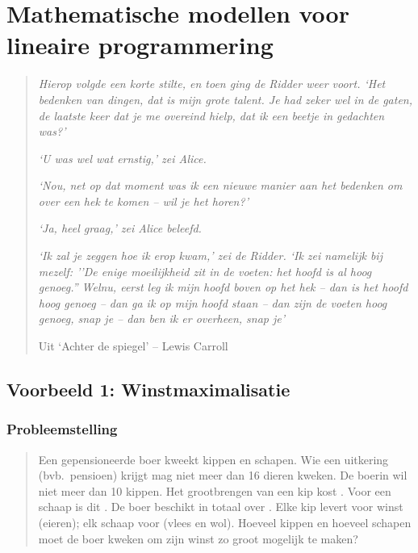 %
%
% 
%
%


%

\chapter{Mathematische modellen voor lineaire programmering}
\begin{quote}
    \textit{{\small Hierop volgde een korte stilte, en toen ging de
    Ridder weer voort. `Het bedenken van dingen, dat is mijn grote
    talent. Je had zeker wel in de gaten, de laatste keer dat je me
    overeind hielp, dat ik een beetje in gedachten was?'}}

    \textit{{\small `U was \emph{wel} wat ernstig,' zei Alice.}}

     \textit{{\small `Nou, net op dat moment was ik een nieuwe manier
     aan het bedenken om over een hek te komen -- wil je het horen?'}}

     \textit{{\small `Ja, heel graag,' zei Alice beleefd.}}

     \textit{{\small `Ik zal je zeggen hoe ik erop kwam,' zei de Ridder. `Ik zei
     namelijk bij mezelf: ''De enige moeilijkheid zit in de voeten:
     het \emph{hoofd} is al hoog genoeg.'' Welnu, eerst leg ik mijn hoofd
     boven op het hek -- dan is het hoofd hoog genoeg -- dan ga ik op
     mijn hoofd staan -- dan zijn de voeten hoog genoeg, snap je --
     dan ben ik er overheen, snap je'}}

          Uit `Achter de spiegel' -- Lewis Carroll
\end{quote}


\newpage
\section{Voorbeeld 1: Winstmaximalisatie}\label{sec.maxprob}
\subsection{Probleemstelling}
\begin{quote}
Een gepensioneerde boer kweekt kippen en schapen. Wie een uitkering
(bvb.\ pensioen) krijgt mag niet meer dan 16 dieren kweken. De
boerin wil niet meer dan 10 kippen. Het grootbrengen van een
kip kost . Voor een schaap is dit . De boer beschikt
in totaal over . Elke kip levert voor  winst
(eieren); elk schaap voor  (vlees en wol). Hoeveel kippen
en hoeveel schapen moet de boer kweken om zijn winst zo groot
mogelijk te maken?
\end{quote}

